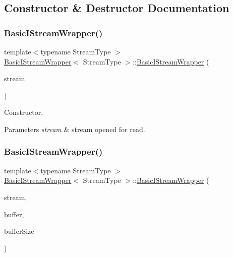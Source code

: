 \subsection{Constructor \& Destructor Documentation}
\mbox{\label{classBasicIStreamWrapper_a3e9a2dd2b6b28243f8f2a911f67cdf56}} 
\subsubsection{\texorpdfstring{Basic\+I\+Stream\+Wrapper()}{BasicIStreamWrapper()}\hspace{0.1cm}{\footnotesize\ttfamily [1/4]}}
{\footnotesize\ttfamily template$<$typename Stream\+Type $>$ \\
\hyperlink{classBasicIStreamWrapper}{Basic\+I\+Stream\+Wrapper}$<$ Stream\+Type $>$\+::\hyperlink{classBasicIStreamWrapper}{Basic\+I\+Stream\+Wrapper} (\begin{DoxyParamCaption}\item[{Stream\+Type \&}]{stream }\end{DoxyParamCaption})\hspace{0.3cm}{\ttfamily [inline]}}



Constructor. 


\begin{DoxyParams}{Parameters}
{\em stream} & stream opened for read. \\
\hline
\end{DoxyParams}
\mbox{\label{classBasicIStreamWrapper_a7a87c6702f1e98256de416ee101a460f}} 
\subsubsection{\texorpdfstring{Basic\+I\+Stream\+Wrapper()}{BasicIStreamWrapper()}\hspace{0.1cm}{\footnotesize\ttfamily [2/4]}}
{\footnotesize\ttfamily template$<$typename Stream\+Type $>$ \\
\hyperlink{classBasicIStreamWrapper}{Basic\+I\+Stream\+Wrapper}$<$ Stream\+Type $>$\+::\hyperlink{classBasicIStreamWrapper}{Basic\+I\+Stream\+Wrapper} (\begin{DoxyParamCaption}\item[{Stream\+Type \&}]{stream,  }\item[{char $\ast$}]{buffer,  }\item[{size\+\_\+t}]{buffer\+Size }\end{DoxyParamCaption})\hspace{0.3cm}{\ttfamily [inline]}}



